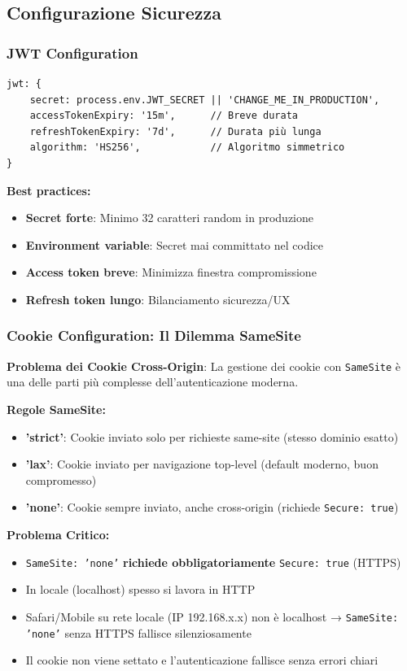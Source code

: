 \documentclass[11pt,a4paper]{article}
\newcommand{\code}[1]{\texttt{#1}}
\newcommand{\important}[1]{\textcolor{red!80!black}{\textbf{#1}}}
\begin{document}
\subsection{Configurazione Sicurezza}

\subsubsection{JWT Configuration}

\begin{lstlisting}[caption=Configurazione JWT]
jwt: {
    secret: process.env.JWT_SECRET || 'CHANGE_ME_IN_PRODUCTION',
    accessTokenExpiry: '15m',      // Breve durata
    refreshTokenExpiry: '7d',      // Durata più lunga
    algorithm: 'HS256',            // Algoritmo simmetrico
}
\end{lstlisting}

\textbf{Best practices:}
\begin{itemize}
    \item \textbf{Secret forte}: Minimo 32 caratteri random in produzione
    \item \textbf{Environment variable}: Secret mai committato nel codice
    \item \textbf{Access token breve}: Minimizza finestra compromissione
    \item \textbf{Refresh token lungo}: Bilanciamento sicurezza/UX
\end{itemize}

\subsubsection{Cookie Configuration: Il Dilemma SameSite}

\important{Problema dei Cookie Cross-Origin}: La gestione dei cookie con \code{SameSite} è una delle parti più complesse dell'autenticazione moderna.

\textbf{Regole SameSite:}
\begin{itemize}
    \item \textbf{'strict'}: Cookie inviato solo per richieste same-site (stesso dominio esatto)
    \item \textbf{'lax'}: Cookie inviato per navigazione top-level (default moderno, buon compromesso)
    \item \textbf{'none'}: Cookie sempre inviato, anche cross-origin (richiede \code{Secure: true})
\end{itemize}

\textbf{Problema Critico:}
\begin{itemize}
    \item \code{SameSite: 'none'} \important{richiede obbligatoriamente} \code{Secure: true} (HTTPS)
    \item In locale (localhost) spesso si lavora in HTTP
    \item Safari/Mobile su rete locale (IP 192.168.x.x) non è localhost → \code{SameSite: 'none'} senza HTTPS fallisce silenziosamente
    \item Il cookie non viene settato e l'autenticazione fallisce senza errori chiari
\end{itemize}
\end{document}
